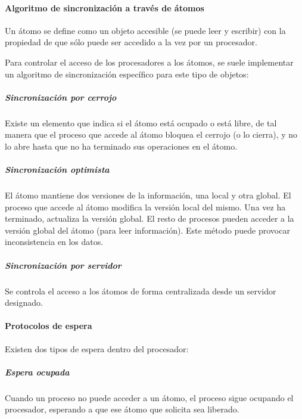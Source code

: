\documentclass[a4paper, 11pt, titlepage]{article}
\begin{document}
            \paragraph{Algoritmo de sincronización a través de átomos}

                Un átomo se define como un objeto accesible (se puede leer y escribir) con la propiedad 
                de que sólo puede ser accedido a la vez por un procesador. 

                Para controlar el acceso de los procesadores a los átomos, se suele implementar un 
                algoritmo de sincronización específico para este tipo de objetos:

                \subparagraph{Sincronización por cerrojo}

                    Existe un elemento que indica si el átomo está ocupado o está libre, de tal manera 
                    que el proceso que accede al átomo bloquea el cerrojo (o lo cierra), y no lo abre 
                    hasta que no ha terminado sus operaciones en el átomo. 

                \subparagraph{Sincronización optimista}

                    El átomo mantiene dos versiones de la información, una local y otra global. El proceso 
                    que accede al átomo modifica la versión local del mismo. Una vez ha terminado, 
                    actualiza la versión global. El resto de procesos pueden acceder a la versión 
                    global del átomo (para leer información). Este método puede provocar inconsistencia 
                    en los datos.

                \subparagraph{Sincronización por servidor}
                
                    Se controla el acceso a los átomos de forma centralizada desde un servidor designado.

            \paragraph{Protocolos de espera}

                Existen dos tipos de espera dentro del procesador:

                    \subparagraph{Espera ocupada}

                        Cuando un proceso no puede acceder a un átomo, el proceso sigue ocupando el 
                        procesador, esperando a que ese átomo que solicita sea liberado.
            
\end{document}
